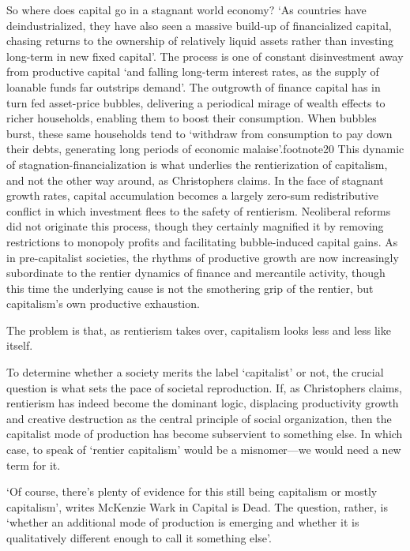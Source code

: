 \documentclass[
]{book}
\begin{document}
So where does capital go in a stagnant world economy? `As countries have deindustrialized, they have also seen a massive build-up of financialized capital, chasing returns to the ownership of relatively liquid assets rather than investing long-term in new fixed capital'. The process is one of constant disinvestment away from productive capital `and falling long-term interest rates, as the supply of loanable funds far outstrips demand'. The outgrowth of finance capital has in turn fed asset-price bubbles, delivering a periodical mirage of wealth effects to richer households, enabling them to boost their consumption. When bubbles burst, these same households tend to `withdraw from consumption to pay down their debts, generating long periods of economic malaise'.footnote20 This dynamic of stagnation-financialization is what underlies the rentierization of capitalism, and not the other way around, as Christophers claims. In the face of stagnant growth rates, capital accumulation becomes a largely zero-sum redistributive conflict in which investment flees to the safety of rentierism. Neoliberal reforms did not originate this process, though they certainly magnified it by removing restrictions to monopoly profits and facilitating bubble-induced capital gains. As in pre-capitalist societies, the rhythms of productive growth are now increasingly subordinate to the rentier dynamics of finance and mercantile activity, though this time the underlying cause is not the smothering grip of the rentier, but capitalism's own productive exhaustion.

The problem is that, as rentierism takes over, capitalism looks less and less like itself.

To determine whether a society merits the label `capitalist' or not, the crucial question is what sets the pace of societal reproduction. If, as Christophers claims, rentierism has indeed become the dominant logic, displacing productivity growth and creative destruction as the central principle of social organization, then the capitalist mode of production has become subservient to something else. In which case, to speak of `rentier capitalism' would be a misnomer---we would need a new term for it.

`Of course, there's plenty of evidence for this still being capitalism or mostly capitalism', writes McKenzie Wark in Capital is Dead. The question, rather, is `whether an additional mode of production is emerging and whether it is qualitatively different enough to call it something else'.
\end{document}
